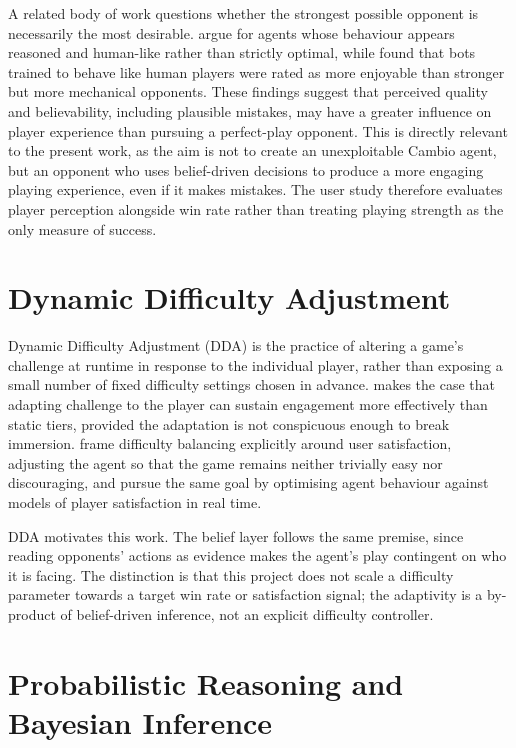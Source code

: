\documentclass[12pt,a4paper,oneside]{report}
\begin{document}
A related body of work questions whether the strongest possible opponent is necessarily the most desirable. \textcite{arrabales2009conscious} argue for agents whose behaviour appears reasoned and human-like rather than strictly optimal, while \textcite{soni2008bots} found that bots trained to behave like human players were rated as more enjoyable than stronger but more mechanical opponents. These findings suggest that perceived quality and believability, including plausible mistakes, may have a greater influence on player experience than pursuing a perfect-play opponent. This is directly relevant to the present work, as the aim is not to create an unexploitable Cambio agent, but an opponent who uses belief-driven decisions to produce a more engaging playing experience, even if it makes mistakes. The user study therefore evaluates player perception alongside win rate rather than treating playing strength as the only measure of success.


\section{Dynamic Difficulty Adjustment}
\label{sec:dda}

Dynamic Difficulty Adjustment (DDA) is the practice of altering a game's challenge
at runtime in response to the individual player, rather than exposing a small number
of fixed difficulty settings chosen in advance. \textcite{hunicke2005dda} makes the
case that adapting challenge to the player can sustain engagement more effectively
than static tiers, provided the adaptation is not conspicuous enough to break
immersion. \textcite{andrade2006dynamic} frame difficulty balancing explicitly around
user satisfaction, adjusting the agent so that the game remains neither trivially
easy nor discouraging, and \textcite{yannakakis2009realtime} pursue the same goal by
optimising agent behaviour against models of player satisfaction in real time.

DDA motivates this work. The belief layer follows the same premise, since reading opponents’ actions as evidence makes the agent’s play contingent on who it is facing. The distinction is that this project does not scale a difficulty parameter
towards a target win rate or satisfaction signal; the adaptivity is a by-product of
belief-driven inference, not an explicit difficulty controller. 


\section{Probabilistic Reasoning and Bayesian Inference}
\end{document}
